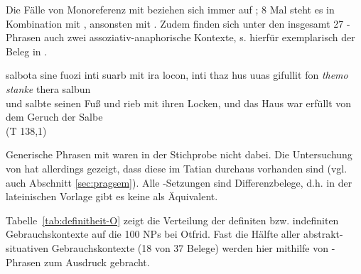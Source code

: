 
 Die Fälle von Monoreferenz mit  beziehen sich immer auf ; 8 Mal steht es in Kombination mit , ansonsten mit . Zudem finden sich unter den insgesamt 27 -Phrasen  auch zwei assoziativ-anaphorische  Kontexte, s. hierfür exemplarisch der Beleg in . 

%

\begin{exe}
\ex \label{ex:T27561}  {salbota} {sine} {fuozi} {inti} {suarb} {mit} {ira} {locon}, {inti} {thaz} {hus} {uuas} {gifullit} {fon} {\textit{themo}} {\textit{stanke}} {thera} {salbun}  \\
{und} {salbte} {seinen } {Fuß} {und} {rieb} {mit} {ihren} {Locken}, {und} {das} {Haus} {war} {erfüllt} {von} {dem} {Geruch} {der} {Salbe} \\
\glt {} (T 138,1)
\end{exe}

Generische Phrasen mit  waren in der Stichprobe nicht dabei. Die Untersuchung von \textcite{Oubouzar1989,Oubouzar1992} hat allerdings gezeigt, dass diese im Tatian durchaus vorhanden sind (vgl. auch Abschnitt \ref{sec:pragsem}). Alle -Setzungen sind  Differenzbelege, d.h. in der lateinischen Vorlage gibt es keine  als Äquivalent.


Tabelle~\ref{tab:definitheit-O} zeigt die Verteilung der definiten bzw. indefiniten Gebrauchskontexte auf die 100 NPs bei Otfrid. Fast die Hälfte aller abstrakt-situativen  Gebrauchskontexte (18 von 37 Belege) werden hier mithilfe von -Phrasen  zum Ausdruck gebracht.

